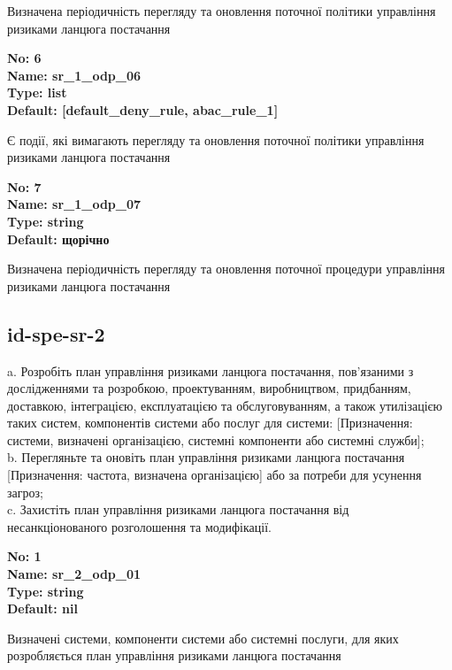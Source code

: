 \documentclass{article}
\begin{document}
{\footnotesize Визначена періодичність перегляду та оновлення поточної політики управління ризиками ланцюга постачання}


{\footnotesize\bfseries
No: 6\\
Name: sr\_\allowbreak{}1\_\allowbreak{}odp\_\allowbreak{}06\\
Type: list\\
Default: [\textquotedbl{}default\_\allowbreak{}deny\_\allowbreak{}rule\textquotedbl{}, \textquotedbl{}abac\_\allowbreak{}rule\_\allowbreak{}1\textquotedbl{}]
}

{\footnotesize Є події, які вимагають перегляду та оновлення поточної політики управління ризиками ланцюга постачання}


{\footnotesize\bfseries
No: 7\\
Name: sr\_\allowbreak{}1\_\allowbreak{}odp\_\allowbreak{}07\\
Type: string\\
Default: \textquotedbl{}щорічно\textquotedbl{}
}

{\footnotesize Визначена періодичність перегляду та оновлення поточної процедури управління ризиками ланцюга постачання}




\subsection{id-spe-sr-2}
a. Розробіть план управління ризиками ланцюга постачання, пов'язаними з дослідженнями та розробкою, проектуванням, виробництвом, придбанням, доставкою, інтеграцією, експлуатацією та обслуговуванням, а також утилізацією таких систем, компонентів системи або послуг для системи: [Призначення: системи, визначені організацією, системні компоненти або системні служби];\\ 
b. Перегляньте та оновіть план управління ризиками ланцюга постачання [Призначення: частота, визначена організацією] або за потреби для усунення загроз;\\ 
c. Захистіть план управління ризиками ланцюга постачання від несанкціонованого розголошення та модифікації.

\vspace{10pt}
{\footnotesize\bfseries
No: 1\\
Name: sr\_\allowbreak{}2\_\allowbreak{}odp\_\allowbreak{}01\\
Type: string\\
Default: nil
}

{\footnotesize Визначені системи, компоненти системи або системні послуги, для яких розробляється план управління ризиками ланцюга постачання}
\end{document}
